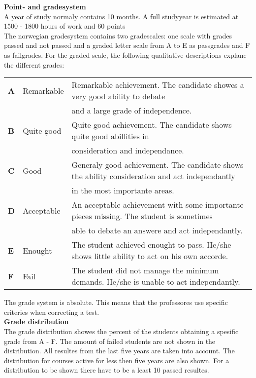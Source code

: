 \documentclass[11pt, A4paper, norsk]{article}
\begin{document}
\newpage

\normalsize
\textbf{Point- and gradesystem} \\
A year of study normaly contains 10 months. A full studyyear is estimated at 1500 - 1800 hours of work and 60 points \\

The norwegian gradesystem contains two gradescales: one scale with grades passed and not passed and a graded letter scale from A to E as passgrades and F as failgrades. For the graded scale, the following qualitative descriptions explane the different grades:

	\begin{tabular}{|l|l|l|}
\hline 
\textbf{A} & Remarkable & Remarkable achievement. The candidate showes a very good ability to debate \\
 &  & and a large grade of independence. \\
\hline
\textbf{B} & Quite good & Quite good achievement. The candidate shows quite good abillities in \\
 &  & consideration and independance. \\
\hline
\textbf{C} & Good & Generaly good achievement. The candidate shows the ability consideration and act independantly \\
 &  & in the most importante areas. \\
\hline
\textbf{D} & Acceptable & An acceptable achievement with some importante pieces missing. The student is sometimes \\
 &  & able to debate an answere and act independantly. \\
\hline
\textbf{E} & Enought & The student achieved enought to pass. He/she shows little ability to act on his own accorde. \\
\hline
\textbf{F} & Fail & The student did not manage the minimum demands. He/she is unable to act independantly. \\
\hline
	\end{tabular}
The grade system is absolute. This means that the professores use specific criteries when correcting a test. \\

\textbf{Grade distribution} \\
The grade distribution showes the percent of the students obtaining a spesific grade from A - F. The amount of failed students are not shown in the distribution. All resultes from the last five years are taken into account. The distribution for courses active for less then five years are also shown. For a distribution to be shown there have to be a least 10 passed resultes.
\end{document}
